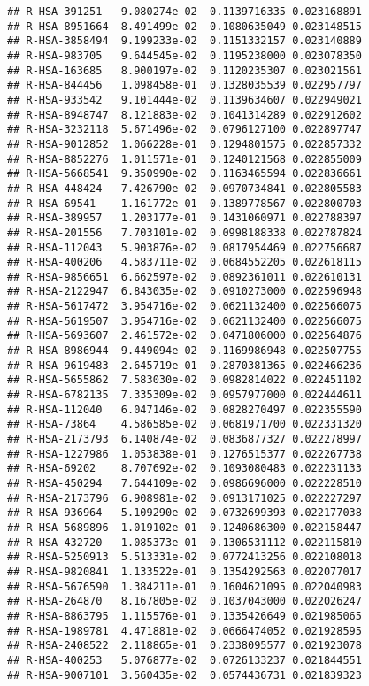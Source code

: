 \documentclass[
]{article}
\begin{document}
\begin{verbatim}
## R-HSA-391251   9.080274e-02  0.1139716335 0.023168891
## R-HSA-8951664  8.491499e-02  0.1080635049 0.023148515
## R-HSA-3858494  9.199233e-02  0.1151332157 0.023140889
## R-HSA-983705   9.644545e-02  0.1195238000 0.023078350
## R-HSA-163685   8.900197e-02  0.1120235307 0.023021561
## R-HSA-844456   1.098458e-01  0.1328035539 0.022957797
## R-HSA-933542   9.101444e-02  0.1139634607 0.022949021
## R-HSA-8948747  8.121883e-02  0.1041314289 0.022912602
## R-HSA-3232118  5.671496e-02  0.0796127100 0.022897747
## R-HSA-9012852  1.066228e-01  0.1294801575 0.022857332
## R-HSA-8852276  1.011571e-01  0.1240121568 0.022855009
## R-HSA-5668541  9.350990e-02  0.1163465594 0.022836661
## R-HSA-448424   7.426790e-02  0.0970734841 0.022805583
## R-HSA-69541    1.161772e-01  0.1389778567 0.022800703
## R-HSA-389957   1.203177e-01  0.1431060971 0.022788397
## R-HSA-201556   7.703101e-02  0.0998188338 0.022787824
## R-HSA-112043   5.903876e-02  0.0817954469 0.022756687
## R-HSA-400206   4.583711e-02  0.0684552205 0.022618115
## R-HSA-9856651  6.662597e-02  0.0892361011 0.022610131
## R-HSA-2122947  6.843035e-02  0.0910273000 0.022596948
## R-HSA-5617472  3.954716e-02  0.0621132400 0.022566075
## R-HSA-5619507  3.954716e-02  0.0621132400 0.022566075
## R-HSA-5693607  2.461572e-02  0.0471806000 0.022564876
## R-HSA-8986944  9.449094e-02  0.1169986948 0.022507755
## R-HSA-9619483  2.645719e-01  0.2870381365 0.022466236
## R-HSA-5655862  7.583030e-02  0.0982814022 0.022451102
## R-HSA-6782135  7.335309e-02  0.0957977000 0.022444611
## R-HSA-112040   6.047146e-02  0.0828270497 0.022355590
## R-HSA-73864    4.586585e-02  0.0681971700 0.022331320
## R-HSA-2173793  6.140874e-02  0.0836877327 0.022278997
## R-HSA-1227986  1.053838e-01  0.1276515377 0.022267738
## R-HSA-69202    8.707692e-02  0.1093080483 0.022231133
## R-HSA-450294   7.644109e-02  0.0986696000 0.022228510
## R-HSA-2173796  6.908981e-02  0.0913171025 0.022227297
## R-HSA-936964   5.109290e-02  0.0732699393 0.022177038
## R-HSA-5689896  1.019102e-01  0.1240686300 0.022158447
## R-HSA-432720   1.085373e-01  0.1306531112 0.022115810
## R-HSA-5250913  5.513331e-02  0.0772413256 0.022108018
## R-HSA-9820841  1.133522e-01  0.1354292563 0.022077017
## R-HSA-5676590  1.384211e-01  0.1604621095 0.022040983
## R-HSA-264870   8.167805e-02  0.1037043000 0.022026247
## R-HSA-8863795  1.115576e-01  0.1335426649 0.021985065
## R-HSA-1989781  4.471881e-02  0.0666474052 0.021928595
## R-HSA-2408522  2.118865e-01  0.2338095577 0.021923078
## R-HSA-400253   5.076877e-02  0.0726133237 0.021844551
## R-HSA-9007101  3.560435e-02  0.0574436731 0.021839323

\end{verbatim}
\end{document}
